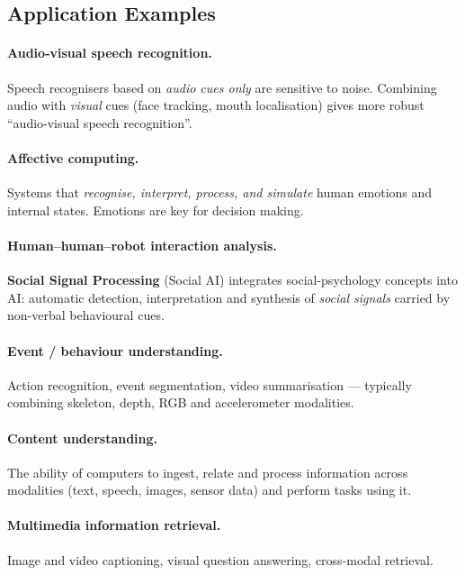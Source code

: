 \documentclass[11pt,a4paper]{article}
\theoremstyle{definition}
\theoremstyle{plain}
\theoremstyle{remark}
\begin{document}
\subsection{Application Examples}

\paragraph{Audio-visual speech recognition.} Speech recognisers based on \emph{audio cues only} are sensitive to noise. Combining audio with \emph{visual} cues (face tracking, mouth localisation) gives more robust ``audio-visual speech recognition''.

\paragraph{Affective computing.} Systems that \emph{recognise, interpret, process, and simulate} human emotions and internal states. Emotions are key for decision making.

\paragraph{Human--human--robot interaction analysis.} \textbf{Social Signal Processing} (Social AI) integrates social-psychology concepts into AI: automatic detection, interpretation and synthesis of \emph{social signals} carried by non-verbal behavioural cues.

\paragraph{Event / behaviour understanding.} Action recognition, event segmentation, video summarisation --- typically combining skeleton, depth, RGB and accelerometer modalities.

\paragraph{Content understanding.} The ability of computers to ingest, relate and process information across modalities (text, speech, images, sensor data) and perform tasks using it.

\paragraph{Multimedia information retrieval.} Image and video captioning, visual question answering, cross-modal retrieval.
\end{document}
